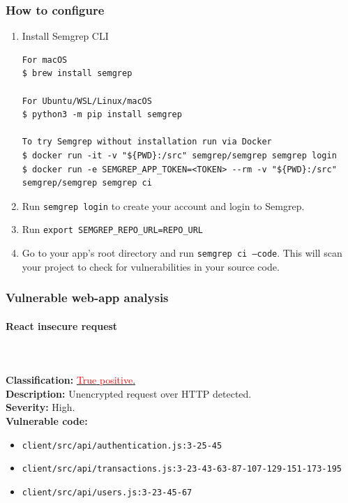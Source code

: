 \documentclass[]{article}
\begin{document}
\subsubsection{How to configure}
 
\begin{enumerate}
\item Install Semgrep CLI
\begin{lstlisting}[numbers=none]
For macOS
$ brew install semgrep

For Ubuntu/WSL/Linux/macOS
$ python3 -m pip install semgrep

To try Semgrep without installation run via Docker
$ docker run -it -v "${PWD}:/src" semgrep/semgrep semgrep login
$ docker run -e SEMGREP_APP_TOKEN=<TOKEN> --rm -v "${PWD}:/src" semgrep/semgrep semgrep ci
\end{lstlisting}
\item Run \texttt{semgrep login} to create your account and login to Semgrep. 
\item Run \texttt{export SEMGREP\_REPO\_URL=REPO\_URL}
\item Go to your app's root directory and run \texttt{semgrep ci --code}. This will scan your project to check for vulnerabilities in your source code.
\end{enumerate}

\subsubsection{Vulnerable web-app analysis}

\paragraph{React insecure request} \mbox{} \\ \\
\textbf{Classification:} \hyperref[subsubsec:cleartext_transmission_of_sensitive_information]{\textcolor{red}{True} \textcolor{red}{positive}.} \\ 
\textbf{Description:} Unencrypted request over HTTP detected. \\ 
\textbf{Severity:} High. \\ 
\textbf{Vulnerable code:} 
\begin{itemize}
    \item \texttt{client/src/api/authentication.js:3-25-45}
    \item \texttt{client/src/api/transactions.js:3-23-43-63-87-107-129-151-173-195}
    \item \texttt{client/src/api/users.js:3-23-45-67}
\end{itemize}
\end{document}
